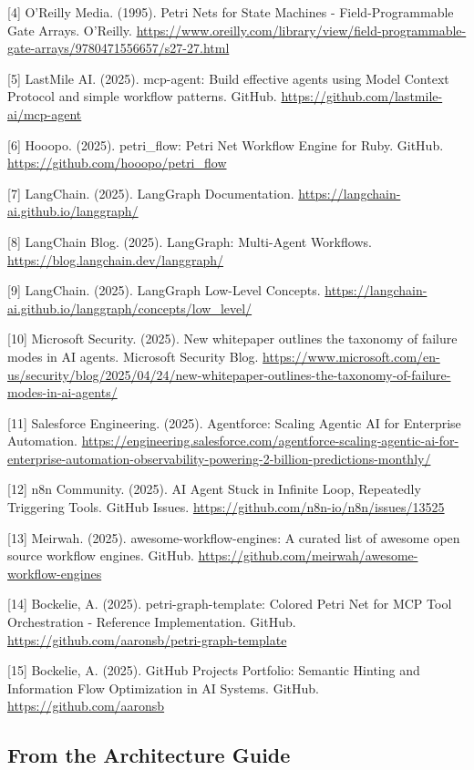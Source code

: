 \documentclass[11pt,a4paper]{article}
\begin{document}
[4] O'Reilly Media. (1995). Petri Nets for State Machines - Field-Programmable Gate Arrays. O'Reilly. \url{https://www.oreilly.com/library/view/field-programmable-gate-arrays/9780471556657/s27-27.html}

[5] LastMile AI. (2025). mcp-agent: Build effective agents using Model Context Protocol and simple workflow patterns. GitHub. \url{https://github.com/lastmile-ai/mcp-agent}

[6] Hooopo. (2025). petri\_flow: Petri Net Workflow Engine for Ruby. GitHub. \url{https://github.com/hooopo/petri_flow}

[7] LangChain. (2025). LangGraph Documentation. \url{https://langchain-ai.github.io/langgraph/}

[8] LangChain Blog. (2025). LangGraph: Multi-Agent Workflows. \url{https://blog.langchain.dev/langgraph/}

[9] LangChain. (2025). LangGraph Low-Level Concepts. \url{https://langchain-ai.github.io/langgraph/concepts/low_level/}

[10] Microsoft Security. (2025). New whitepaper outlines the taxonomy of failure modes in AI agents. Microsoft Security Blog. \url{https://www.microsoft.com/en-us/security/blog/2025/04/24/new-whitepaper-outlines-the-taxonomy-of-failure-modes-in-ai-agents/}

[11] Salesforce Engineering. (2025). Agentforce: Scaling Agentic AI for Enterprise Automation. \url{https://engineering.salesforce.com/agentforce-scaling-agentic-ai-for-enterprise-automation-observability-powering-2-billion-predictions-monthly/}

[12] n8n Community. (2025). AI Agent Stuck in Infinite Loop, Repeatedly Triggering Tools. GitHub Issues. \url{https://github.com/n8n-io/n8n/issues/13525}

[13] Meirwah. (2025). awesome-workflow-engines: A curated list of awesome open source workflow engines. GitHub. \url{https://github.com/meirwah/awesome-workflow-engines}

[14] Bockelie, A. (2025). petri-graph-template: Colored Petri Net for MCP Tool Orchestration - Reference Implementation. GitHub. \url{https://github.com/aaronsb/petri-graph-template}

[15] Bockelie, A. (2025). GitHub Projects Portfolio: Semantic Hinting and Information Flow Optimization in AI Systems. GitHub. \url{https://github.com/aaronsb}

\subsection*{From the Architecture Guide}
\end{document}

